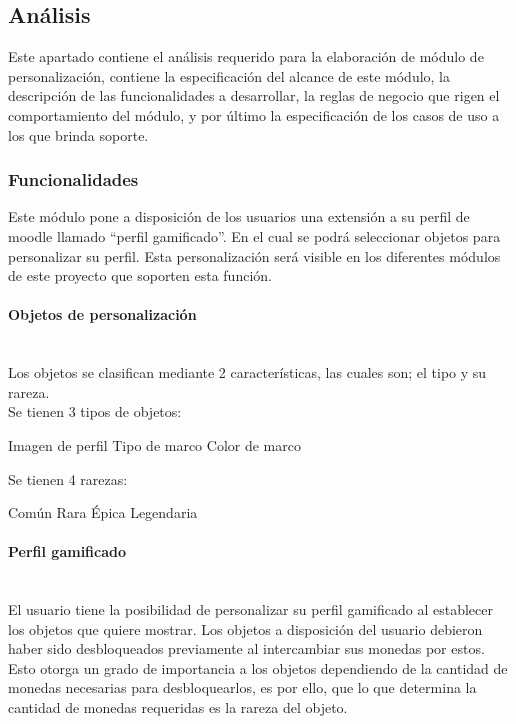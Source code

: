 
\subsection{Análisis}

 Este apartado contiene el análisis requerido para la elaboración de módulo de personalización,
 contiene la especificación del alcance de este módulo, la descripción de las funcionalidades
 a desarrollar, la reglas de negocio que rigen el comportamiento del módulo, y por último la
 especificación de los casos de uso a los que brinda soporte.

\subsubsection{Funcionalidades}


 \noindent
 Este módulo pone a disposición de los usuarios una extensión a su perfil de moodle llamado ``perfil gamificado''. En el cual se podrá
 seleccionar objetos para personalizar su perfil. Esta personalización será visible en los diferentes módulos de este proyecto que soporten
 esta función.

 \paragraph{Objetos de personalización}\mbox{}\\
 Los objetos se clasifican mediante 2 características, las cuales son; el tipo y su rareza.\\
 \noindent Se tienen 3 tipos de objetos:
 \begin{multicols}{2}
   \begin{Titemize}
     \Titem Imagen de perfil
     \Titem Tipo de marco
     \Titem Color de marco
   \end{Titemize}
   \noindent Se tienen 4 rarezas:
   \begin{Titemize}
     \Titem Común
     \Titem Rara
     \Titem Épica
     \Titem Legendaria
   \end{Titemize}
 \end{multicols}
 \paragraph{Perfil gamificado}\mbox{}\\
   El usuario tiene la posibilidad de personalizar su perfil gamificado al establecer
   los objetos que quiere mostrar. Los objetos a disposición del usuario debieron haber sido desbloqueados
   previamente al intercambiar sus monedas por estos.
   \noindent Esto otorga un grado de importancia a los objetos dependiendo de la cantidad de monedas necesarias para desbloquearlos,
   es por ello, que lo que determina la cantidad de monedas requeridas es la rareza del objeto.


